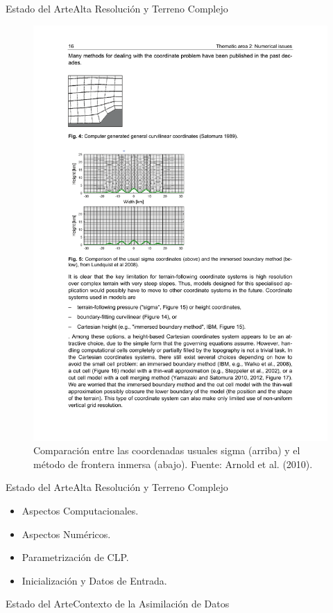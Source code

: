 \documentclass[mathserif]{beamer}
\begin{document}
\begin{frame}{Estado del Arte}{Alta Resolución y Terreno Complejo}
	\begin{figure}[h!]
		\centering
		\includegraphics[width=0.75\linewidth,trim={2.6cm 13.5cm 9.2cm 9cm},clip]{fig/02/coordinates}
		\caption{Comparación entre las coordenadas usuales sigma (arriba) y el método de frontera inmersa (abajo). Fuente: Arnold et al. (2010).}
	\end{figure}
\end{frame}

\begin{frame}{Estado del Arte}{Alta Resolución y Terreno Complejo}
	\begin{itemize}
		\item Aspectos Computacionales.
		\item Aspectos Numéricos.
		\item Parametrización de CLP.
		\item Inicialización y Datos de Entrada.
	\end{itemize}
\end{frame}

\begin{frame}{Estado del Arte}{Contexto de la Asimilación de Datos}
	
\end{frame}
\end{document}
